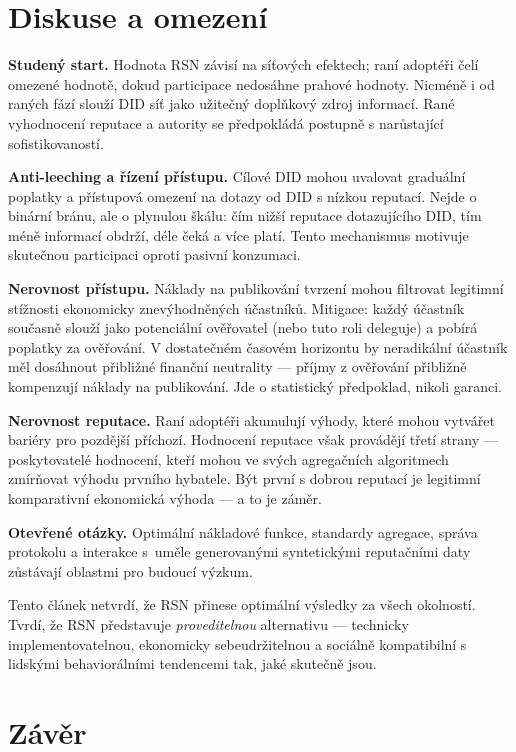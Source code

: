 \documentclass[11pt,a4paper,twocolumn]{article}
\begin{document}
\section{Diskuse a omezení}

\textbf{Studený start.} Hodnota RSN závisí na síťových efektech; raní adoptéři čelí omezené hodnotě, dokud participace nedosáhne prahové hodnoty. Nicméně i od raných fází slouží DID síť jako užitečný doplňkový zdroj informací. Rané vyhodnocení reputace a autority se předpokládá postupně s narůstající sofistikovaností.

\textbf{Anti-leeching a řízení přístupu.} Cílové DID mohou uvalovat graduální poplatky a přístupová omezení na dotazy od DID s nízkou reputací. Nejde o binární bránu, ale o plynulou škálu: čím nižší reputace dotazujícího DID, tím méně informací obdrží, déle čeká a více platí. Tento mechanismus motivuje skutečnou participaci oproti pasivní konzumaci.

\textbf{Nerovnost přístupu.} Náklady na publikování tvrzení mohou filtrovat legitimní stížnosti ekonomicky znevýhodněných účastníků. Mitigace: každý účastník současně slouží jako potenciální ověřovatel (nebo tuto roli deleguje) a pobírá poplatky za ověřování. V dostatečném časovém horizontu by neradikální účastník měl dosáhnout přibližné finanční neutrality --- příjmy z ověřování přibližně kompenzují náklady na publikování. Jde o statistický předpoklad, nikoli garanci.

\textbf{Nerovnost reputace.} Raní adoptéři akumulují výhody, které mohou vytvářet bariéry pro pozdější příchozí. Hodnocení reputace však provádějí třetí strany --- poskytovatelé hodnocení, kteří mohou ve svých agregačních algoritmech zmírňovat výhodu prvního hybatele. Být první s dobrou reputací je legitimní komparativní ekonomická výhoda --- a to je záměr.

\textbf{Otevřené otázky.} Optimální nákladové funkce, standardy agregace, správa protokolu a interakce s~uměle generovanými syntetickými reputačními daty zůstávají oblastmi pro budoucí výzkum.

Tento článek netvrdí, že RSN přinese optimální výsledky za všech okolností. Tvrdí, že RSN představuje \emph{proveditelnou} alternativu --- technicky implementovatelnou, ekonomicky sebeudržitelnou a sociálně kompatibilní s lidskými behaviorálními tendencemi tak, jaké skutečně jsou.

\section{Závěr}
\end{document}
